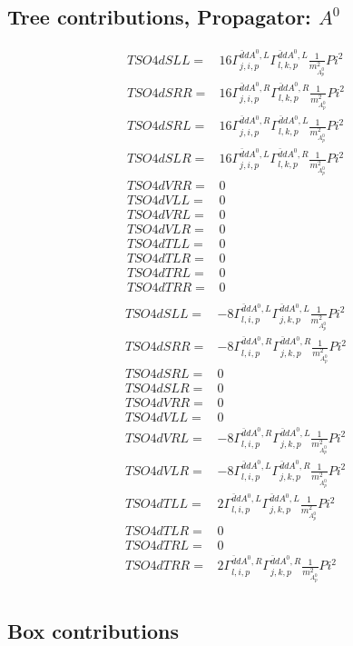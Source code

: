 \documentclass[A4,landscape]{article}
\begin{document}
\subsection{Tree contributions, Propagator: $A^0$} 

\begin{align} 
  TSO4dSLL= & 16 \Gamma^{\bar{d}d A^0 ,L}_{j, i, p} \Gamma^{\bar{d}d A^0 ,L}_{l, k, p} \frac{1}{m^2_{A^0_{{p}}}} Pi^2 \\ 
  TSO4dSRR= & 16 \Gamma^{\bar{d}d A^0 ,R}_{j, i, p} \Gamma^{\bar{d}d A^0 ,R}_{l, k, p} \frac{1}{m^2_{A^0_{{p}}}} Pi^2 \\ 
  TSO4dSRL= & 16 \Gamma^{\bar{d}d A^0 ,R}_{j, i, p} \Gamma^{\bar{d}d A^0 ,L}_{l, k, p} \frac{1}{m^2_{A^0_{{p}}}} Pi^2 \\ 
  TSO4dSLR= & 16 \Gamma^{\bar{d}d A^0 ,L}_{j, i, p} \Gamma^{\bar{d}d A^0 ,R}_{l, k, p} \frac{1}{m^2_{A^0_{{p}}}} Pi^2 \\ 
  TSO4dVRR= & 0 \\ 
  TSO4dVLL= & 0 \\ 
  TSO4dVRL= & 0 \\ 
  TSO4dVLR= & 0 \\ 
  TSO4dTLL= & 0 \\ 
  TSO4dTLR= & 0 \\ 
  TSO4dTRL= & 0 \\ 
  TSO4dTRR= & 0 \\ 
\end{align} 
\begin{align} 
  TSO4dSLL= & -8 \Gamma^{\bar{d}d A^0 ,L}_{l, i, p} \Gamma^{\bar{d}d A^0 ,L}_{j, k, p} \frac{1}{m^2_{A^0_{{p}}}} Pi^2 \\ 
  TSO4dSRR= & -8 \Gamma^{\bar{d}d A^0 ,R}_{l, i, p} \Gamma^{\bar{d}d A^0 ,R}_{j, k, p} \frac{1}{m^2_{A^0_{{p}}}} Pi^2 \\ 
  TSO4dSRL= & 0 \\ 
  TSO4dSLR= & 0 \\ 
  TSO4dVRR= & 0 \\ 
  TSO4dVLL= & 0 \\ 
  TSO4dVRL= & -8 \Gamma^{\bar{d}d A^0 ,R}_{l, i, p} \Gamma^{\bar{d}d A^0 ,L}_{j, k, p} \frac{1}{m^2_{A^0_{{p}}}} Pi^2 \\ 
  TSO4dVLR= & -8 \Gamma^{\bar{d}d A^0 ,L}_{l, i, p} \Gamma^{\bar{d}d A^0 ,R}_{j, k, p} \frac{1}{m^2_{A^0_{{p}}}} Pi^2 \\ 
  TSO4dTLL= & 2 \Gamma^{\bar{d}d A^0 ,L}_{l, i, p} \Gamma^{\bar{d}d A^0 ,L}_{j, k, p} \frac{1}{m^2_{A^0_{{p}}}} Pi^2 \\ 
  TSO4dTLR= & 0 \\ 
  TSO4dTRL= & 0 \\ 
  TSO4dTRR= & 2 \Gamma^{\bar{d}d A^0 ,R}_{l, i, p} \Gamma^{\bar{d}d A^0 ,R}_{j, k, p} \frac{1}{m^2_{A^0_{{p}}}} Pi^2 \\ 
\end{align} 
\subsection{Box contributions} 
\end{document}
